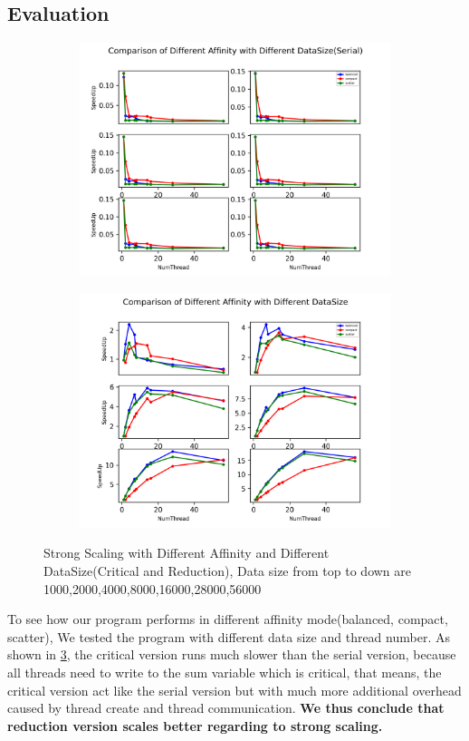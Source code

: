 \documentclass[article]{scrartcl}
\begin{document}
\subsection{Evaluation}
\begin{figure}[ht]
  \begin{subfigure}
    \centering
    \includegraphics[width=.5\linewidth]{../figs/Compare_Aff_AllinOne_serial.png}  
    \label{fig:critical}
  \end{subfigure}
  \begin{subfigure}
    \centering
    \includegraphics[width=.5\linewidth]{../figs/Compare_Aff_AllinOne.png}  
    \label{fig:reduction}
  \end{subfigure}
  \caption{Strong Scaling with Different Affinity and Different DataSize(Critical and Reduction), Data size from top to down
  are 1000,2000,4000,8000,16000,28000,56000}
  \label{fig:compareAff}
  \end{figure}
  To see how our program performs in different affinity mode(balanced, compact, scatter),
  We tested the program with different data size and thread number. As shown in \ref{fig:compareAff}, 
  the critical version runs much slower than the serial version, because all threads need to write to 
  the sum variable which is critical, that means, the critical version act like the serial version but with much more additional
  overhead caused by thread create and thread communication. \textbf{We thus conclude that reduction version scales better regarding to strong scaling.}\\
\end{document}
